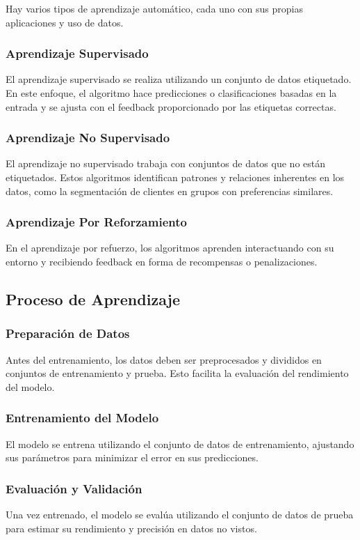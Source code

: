 Hay varios tipos de aprendizaje automático, cada uno con sus propias aplicaciones y uso de datos.

\subsubsection{Aprendizaje Supervisado}
El aprendizaje supervisado se realiza utilizando un conjunto de datos etiquetado. En este enfoque, el algoritmo hace predicciones o clasificaciones basadas en la entrada y se ajusta con el feedback proporcionado por las etiquetas correctas.

\subsubsection{Aprendizaje No Supervisado}
El aprendizaje no supervisado trabaja con conjuntos de datos que no están etiquetados. Estos algoritmos identifican patrones y relaciones inherentes en los datos, como la segmentación de clientes en grupos con preferencias similares.

\subsubsection{Aprendizaje Por Reforzamiento}
En el aprendizaje por refuerzo, los algoritmos aprenden interactuando con su entorno y recibiendo feedback en forma de recompensas o penalizaciones.

\subsection{Proceso de Aprendizaje}

\subsubsection{Preparación de Datos}
Antes del entrenamiento, los datos deben ser preprocesados y divididos en conjuntos de entrenamiento y prueba. Esto facilita la evaluación del rendimiento del modelo.

\subsubsection{Entrenamiento del Modelo}
El modelo se entrena utilizando el conjunto de datos de entrenamiento, ajustando sus parámetros para minimizar el error en sus predicciones.

\subsubsection{Evaluación y Validación}
Una vez entrenado, el modelo se evalúa utilizando el conjunto de datos de prueba para estimar su rendimiento y precisión en datos no vistos.


